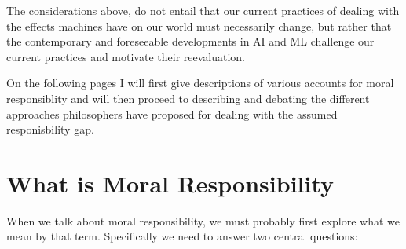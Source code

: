 \documentclass{article}
\begin{document}
The considerations above, do not entail that our current practices of
dealing with the effects machines have on our world must necessarily change,
but rather that the contemporary and foreseeable developments in AI and ML
challenge our current practices and motivate their reevaluation.

On the following pages I will first give descriptions of various accounts for
moral responsiblity and will then proceed to describing and debating the
different approaches philosophers have proposed for dealing with the assumed
responisbility gap.

%
%
%
%
%

\section{What is Moral Responsibility}
When we talk about moral responsibility, we must probably first explore what we
mean by that term. Specifically we need to answer two central questions:\\
\end{document}
